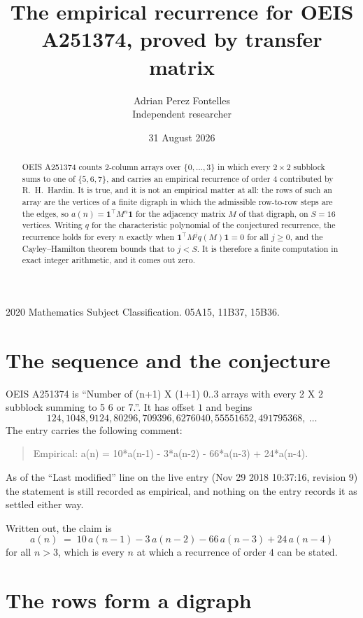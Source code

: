 \documentclass[11pt,a4paper]{article}
\title{The empirical recurrence for OEIS A251374, proved by transfer matrix}
\author{Adrian Perez Fontelles\\ \small Independent researcher}
\date{31 August 2026}
\theoremstyle{plain}
\theoremstyle{definition}
\begin{document}
\maketitle

\begin{abstract}
OEIS A251374 counts $2$-column arrays over $\{0,\dots,3\}$ in which every
$2\times2$ subblock sums to one of $\{5, 6, 7\}$, and carries an empirical
recurrence of order $4$ contributed by R.~H.~Hardin. It is true, and it is not an
empirical matter at all: the rows of such an array are the vertices of a finite digraph in
which the admissible row-to-row steps are the edges, so $a(n)=\mathbf{1}^{\!\top}M^{n}
\mathbf{1}$ for the adjacency matrix $M$ of that digraph, on $S=16$ vertices. Writing
$q$ for the characteristic polynomial of the conjectured recurrence, the recurrence holds
for every $n$ exactly when $\mathbf{1}^{\!\top}M^{j}q(M)\mathbf{1}=0$ for all
$j\ge0$, and the Cayley--Hamilton theorem bounds that to $j<S$. It is therefore a finite
computation in exact integer arithmetic, and it comes out zero.
\end{abstract}

\noindent\small 2020 Mathematics Subject Classification. 05A15, 11B37, 15B36.\normalsize

\section{The sequence and the conjecture}

OEIS A251374 is ``Number of (n+1) X (1+1) 0..3 arrays with every 2 X 2 subblock summing to 5 6 or 7.''. It has offset $1$
and begins
\[
124, 1048, 9124, 80296, 709396, 6276040, 55551652, 491795368,\ \dots
\]
The entry carries the following comment:
\begin{quote}\small
Empirical: a(n) = 10*a(n-1) - 3*a(n-2) - 66*a(n-3) + 24*a(n-4).
\end{quote}
As of the ``Last modified'' line on the live entry (Nov 29 2018 10:37:16, revision 9) the statement is
still recorded as empirical, and nothing on the entry records it as settled either way.

Written out, the claim is
\begin{equation}\label{eq:conj}
a(n)\;=\;10\,a(n-1) - 3\,a(n-2) - 66\,a(n-3) + 24\,a(n-4)
\end{equation}
for all $n>3$, which is every $n$ at which a recurrence of order $4$ can be
stated.

\section{The rows form a digraph}
\end{document}
